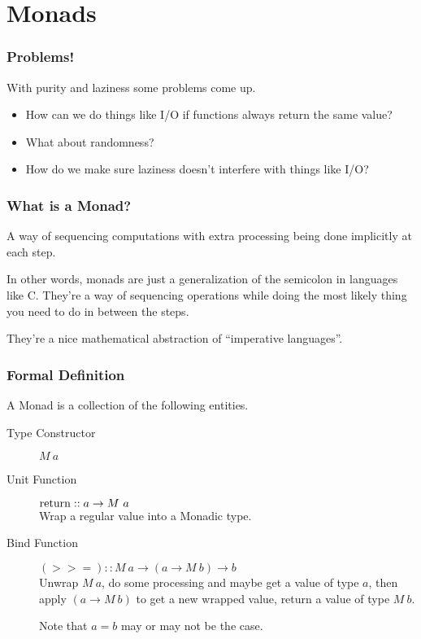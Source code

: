 \documentclass[presentation.tex]{subfiles}
\begin{document}
\section{Monads}
\begin{frame}
  \frametitle{Problems!}

  With purity and laziness some problems come up.

  \begin{itemize}
  \item How can we do things like I/O if functions always return the same value?
  \item What about randomness?
  \item How do we make sure laziness doesn't interfere with things like I/O?
  \end{itemize}
\end{frame}

\begin{frame}
  \frametitle{What is a Monad?}

  A way of sequencing computations with extra processing being done
  implicitly at each step.


\end{frame}

\begin{frame}
  In other words, monads are just a generalization of the semicolon in
  languages like C. They're a way of sequencing operations while doing
  the most likely thing you need to do in between the steps.

  They're a nice mathematical abstraction of ``imperative languages''.
\end{frame}

\begin{frame}
  \frametitle{Formal Definition}

  A Monad is a collection of the following entities.

  \begin{description}
  \item[Type Constructor]
    $M\ a$

  \item[Unit Function]
    $\operatorname{return}::a\rightarrow M\ a$\\
    Wrap a regular value into a Monadic type.

  \item[Bind Function]
    $(>>=)::M\ a\rightarrow(a\rightarrow M\ b)\rightarrow b$\\
    Unwrap $M\ a$, do some processing and maybe get a value of type $a$, then
    apply $(a\rightarrow M\ b)$ to get a new wrapped value, return a value of
    type $M\ b$.

    Note that $a=b$ may or may not be the case.
  \end{description}
\end{frame}
\end{document}

